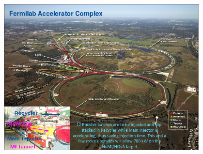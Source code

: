 \begin{frame}
\begin{figure}
\label{fig:LBNF_FermilabAccComplex}
\centering
\includegraphics[width=0.95\textwidth, keepaspectratio=true]{figs/FermilabAccelerator.png}
\end{figure}
\end{frame}

